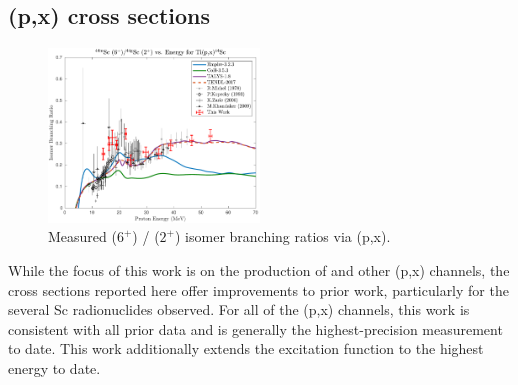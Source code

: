 


\subsection{(p,x) cross sections} 


\begin{figure}[h]
 \centering
 \includegraphics[width=0.5\textwidth]{./figures/44Sc_IBR.pdf}
 \caption{Measured  ($6^+$) /   ($2^+$)  isomer branching ratios via (p,x).}
 \label{fig:44Sc_IBR}
\end{figure}



While the focus of this work is on the production of   and other (p,x) channels, the cross sections reported here offer improvements to prior work, particularly for the several Sc radionuclides observed. 
For all of the (p,x) channels, this work is consistent with all prior data and is generally the highest-precision measurement to date.
This work additionally  extends the  excitation function to the highest energy to date. 



